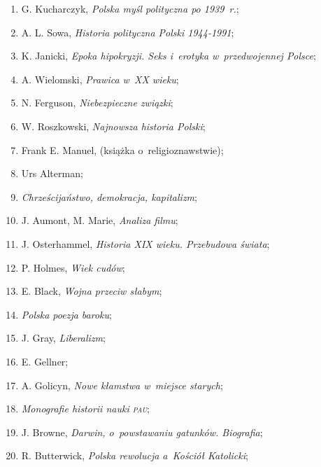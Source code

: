 \documentclass[a4paper,11pt]{article}
\begin{document}
\begin{enumerate}
\item G. Kucharczyk, \textit{Polska myśl polityczna po 1939~r.};

\item A. L. Sowa, \textit{Historia polityczna Polski 1944-1991};

\item K. Janicki, \textit{Epoka hipokryzji. Seks i~erotyka
    w~przedwojennej Polsce};

\item A. Wielomski, \textit{Prawica w~XX wieku};

\item N. Ferguson, \textit{Niebezpieczne związki};

\item W. Roszkowski, \textit{Najnowsza historia Polski};

\item Frank E. Manuel, (książka o~religioznawstwie);

\item Urs Alterman;

\item \textit{Chrześcijaństwo, demokracja, kapitalizm};

\item J. Aumont, M. Marie, \textit{Analiza filmu};

\item J. Osterhammel, \textit{Historia XIX wieku. Przebudowa świata};

\item P. Holmes, \textit{Wiek cudów};

\item E. Black, \textit{Wojna przeciw słabym};

\item \textit{Polska poezja baroku};

\item J. Gray, \textit{Liberalizm};

\item E. Gellner;

\item A. Golicyn, \textit{Nowe kłamstwa w~miejsce starych};

\item \textit{Monografie historii nauki \textsc{pau}};

\item J. Browne, \textit{Darwin, o~powstawaniu gatunków. Biografia};

\item R. Butterwick, \textit{Polska rewolucja a~Kościół Katolicki};


\end{enumerate}
\end{document}
